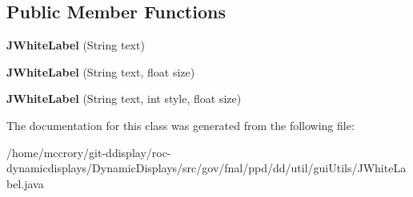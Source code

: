 \subsection*{Public Member Functions}
\begin{DoxyCompactItemize}
\item 
\hypertarget{classgov_1_1fnal_1_1ppd_1_1dd_1_1util_1_1guiUtils_1_1JWhiteLabel_aba0b416af91c261f39ba3a495a04c7cc}{{\bfseries J\-White\-Label} (String text)}\label{classgov_1_1fnal_1_1ppd_1_1dd_1_1util_1_1guiUtils_1_1JWhiteLabel_aba0b416af91c261f39ba3a495a04c7cc}

\item 
\hypertarget{classgov_1_1fnal_1_1ppd_1_1dd_1_1util_1_1guiUtils_1_1JWhiteLabel_a06b0ad34fb1e885990a358d562ed2daa}{{\bfseries J\-White\-Label} (String text, float size)}\label{classgov_1_1fnal_1_1ppd_1_1dd_1_1util_1_1guiUtils_1_1JWhiteLabel_a06b0ad34fb1e885990a358d562ed2daa}

\item 
\hypertarget{classgov_1_1fnal_1_1ppd_1_1dd_1_1util_1_1guiUtils_1_1JWhiteLabel_a7c4319d123b76e2da1c282bac6b2bafb}{{\bfseries J\-White\-Label} (String text, int style, float size)}\label{classgov_1_1fnal_1_1ppd_1_1dd_1_1util_1_1guiUtils_1_1JWhiteLabel_a7c4319d123b76e2da1c282bac6b2bafb}

\end{DoxyCompactItemize}


The documentation for this class was generated from the following file\-:\begin{DoxyCompactItemize}
\item 
/home/mccrory/git-\/ddisplay/roc-\/dynamicdisplays/\-Dynamic\-Displays/src/gov/fnal/ppd/dd/util/gui\-Utils/J\-White\-Label.\-java\end{DoxyCompactItemize}
